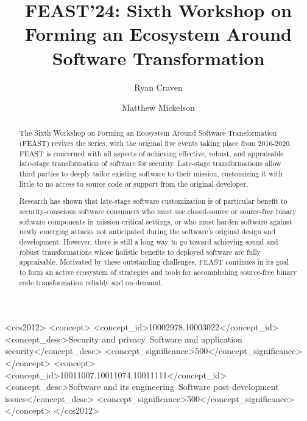 \documentclass[sigconf]{acmart}
\begin{document}
\fancyhead{}

\title[FEAST'24]{FEAST'24: Sixth Workshop on Forming an Ecosystem Around Software Transformation}

\author{Ryan Craven}

\author{Matthew Mickelson}

\renewcommand{\shortauthors}{Ryan Craven and Matthew Mickelson}

\begin{abstract}
The Sixth Workshop on Forming an Ecosystem Around Software Transformation (FEAST)
revives the series, with the original five events taking place from 2016-2020.
FEAST is concerned with all aspects of achieving effective, robust, and appraisable late-stage
transformation of software for security. Late-stage transformations allow
third parties to deeply tailor existing software to their mission,
customizing it with little to no access to source code or support from the original developer.

Research has shown that late-stage software customization is of particular benefit to security-conscious
software consumers who must use closed-source or source-free binary software components in mission-critical settings,
or who must harden software against newly emerging attacks not anticipated during the software's original design and development.
However, there is still a long way to go toward achieving sound and robust transformations whose
holistic benefits to deployed software are fully appraisable.
Motivated by these outstanding challenges, FEAST continues in its goal to form an active ecosystem of strategies and tools
for accomplishing source-free binary code transformation reliably and on-demand.
\end{abstract}

\begin{CCSXML}
  <ccs2012>
  <concept>
  <concept_id>10002978.10003022</concept_id>
  <concept_desc>Security and privacy~Software and application security</concept_desc>
  <concept_significance>500</concept_significance>
  </concept>
  <concept>
  <concept_id>10011007.10011074.10011111</concept_id>
  <concept_desc>Software and its engineering~Software post-development issues</concept_desc>
  <concept_significance>500</concept_significance>
  </concept>
  </ccs2012>
\end{CCSXML}
  
\end{document}
